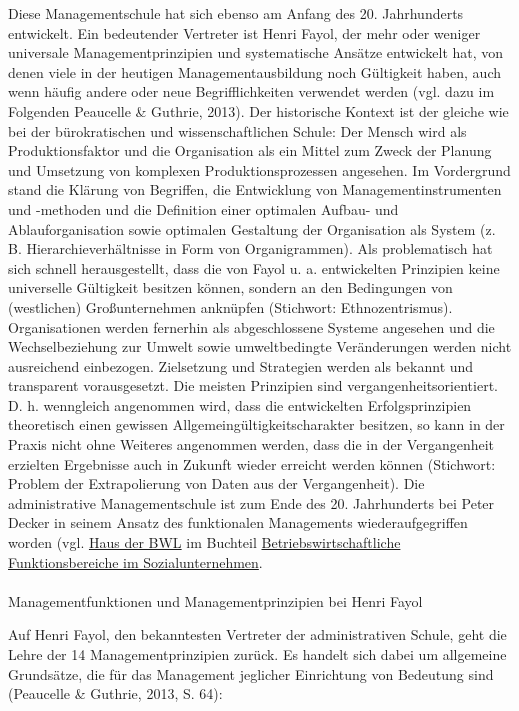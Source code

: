 \documentclass[
  letterpaper,
]{book}
\makeatletter
\let\oldparagraph\paragraph
\renewcommand{\paragraph}{
    \@ifstar
      \xxxParagraphStar
      \xxxParagraphNoStar
  }
\newcommand{\xxxParagraphStar}[1]{\oldparagraph*{#1}\mbox{}}
\newcommand{\xxxParagraphNoStar}[1]{\oldparagraph{#1}\mbox{}}
\makeatother
\begin{document}
Diese Managementschule hat sich ebenso am Anfang des 20. Jahrhunderts
entwickelt. Ein bedeutender Vertreter ist Henri Fayol, der mehr oder
weniger universale Managementprinzipien und systematische Ansätze
entwickelt hat, von denen viele in der heutigen Managementausbildung
noch Gültigkeit haben, auch wenn häufig andere oder neue
Begrifflichkeiten verwendet werden (vgl. dazu im Folgenden Peaucelle \&
Guthrie, 2013). Der historische Kontext ist der gleiche wie bei der
bürokratischen und wissenschaftlichen Schule: Der Mensch wird als
Produktionsfaktor und die Organisation als ein Mittel zum Zweck der
Planung und Umsetzung von komplexen Produktionsprozessen angesehen. Im
Vordergrund stand die Klärung von Begriffen, die Entwicklung von
Managementinstrumenten und -methoden und die Definition einer optimalen
Aufbau- und Ablauforganisation sowie optimalen Gestaltung der
Organisation als System (z. B. Hierarchieverhältnisse in Form von
Organigrammen). Als problematisch hat sich schnell herausgestellt, dass
die von Fayol u. a. entwickelten Prinzipien keine universelle Gültigkeit
besitzen können, sondern an den Bedingungen von (westlichen)
Großunternehmen anknüpfen (Stichwort: Ethnozentrismus). Organisationen
werden fernerhin als abgeschlossene Systeme angesehen und die
Wechselbeziehung zur Umwelt sowie umweltbedingte Veränderungen werden
nicht ausreichend einbezogen. Zielsetzung und Strategien werden als
bekannt und transparent vorausgesetzt. Die meisten Prinzipien sind
vergangenheitsorientiert. D. h. wenngleich angenommen wird, dass die
entwickelten Erfolgsprinzipien theoretisch einen gewissen
Allgemeingültigkeitscharakter besitzen, so kann in der Praxis nicht ohne
Weiteres angenommen werden, dass die in der Vergangenheit erzielten
Ergebnisse auch in Zukunft wieder erreicht werden können (Stichwort:
Problem der Extrapolierung von Daten aus der Vergangenheit). Die
administrative Managementschule ist zum Ende des 20. Jahrhunderts bei
Peter Decker in seinem Ansatz des funktionalen Managements
wiederaufgegriffen worden (vgl. \hyperref[figure1]{Haus der BWL} im
Buchteil \hyperref[funktionsbereiche]{Betriebswirtschaftliche
Funktionsbereiche im Sozialunternehmen}.

\paragraph{Managementfunktionen und Managementprinzipien bei Henri
Fayol}\label{henri-fayol}

Auf Henri Fayol, den bekanntesten Vertreter der administrativen Schule,
geht die Lehre der 14 Managementprinzipien zurück. Es handelt sich dabei
um allgemeine Grundsätze, die für das Management jeglicher Einrichtung
von Bedeutung sind (Peaucelle \& Guthrie, 2013, S. 64):
\end{document}
